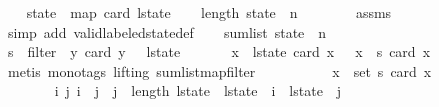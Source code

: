 \begin{isabellebody}
\isanewline
\ \ \isamarkupfalse%
\ {\isacharquery}state\ {\isacharequal}\ {\isachardoublequoteopen}map\ card\ l{\isacharunderscore}state{\isachardoublequoteclose}\isanewline
\ \ \isamarkupfalse%
\ {\isachardoublequoteopen}length\ {\isacharquery}state\ {\isacharequal}\ n\ {\isacharplus}\ {}{\isachardoublequoteclose}\isanewline
\ \ \ \ \isamarkupfalse%
\ assms\isanewline
\ \ \ \ \isamarkupfalse%
\ {\isacharparenleft}simp\ add{\isacharcolon}\ valid{\isacharunderscore}labeled{\isacharunderscore}state{\isacharunderscore}def{\isacharparenright}\isanewline
\isanewline
\ \ \isamarkupfalse%
\ {\isachardoublequoteopen}sum{\isacharunderscore}list\ {\isacharquery}state\ {\isacharequal}\ n{\isachardoublequoteclose}\isanewline
\ \ \isamarkupfalse%
{\isacharminus}\isanewline
\ \ \ \ \isamarkupfalse%
\ {\isacharquery}s\ {\isacharequal}\ {\isachardoublequoteopen}filter\ {\isacharparenleft}{\isasymlambda}\ y{\isachardot}\ card\ y\ {\isasymnoteq}\ {}{\isacharparenright}\ l{\isacharunderscore}state{\isachardoublequoteclose}\isanewline
\isanewline
\ \ \ \ \isamarkupfalse%
\ {\isachardoublequoteopen}{\isacharparenleft}{\isasymSum}\ x\ {\isasymleftarrow}\ l{\isacharunderscore}state{\isachardot}\ card\ x{\isacharparenright}\ {\isacharequal}\ {\isacharparenleft}{\isasymSum}\ x\ {\isasymleftarrow}\ {\isacharquery}s{\isachardot}\ card\ x{\isacharparenright}{\isachardoublequoteclose}\isanewline
\ \ \ \ \ \ \isamarkupfalse%
\ {\isacharparenleft}metis\ {\isacharparenleft}mono{\isacharunderscore}tags{\isacharcomma}\ lifting{\isacharparenright}\ sum{\isacharunderscore}list{\isacharunderscore}map{\isacharunderscore}filter{\isacharparenright}\isanewline
\ \ \ \ \isamarkupfalse%
\ \isamarkupfalse%
\ {\isachardoublequoteopen}{\isachardot}{\isachardot}{\isachardot}\ {\isacharequal}\ {\isacharparenleft}{\isasymSum}\ x\ {\isasymin}\ set\ {\isacharquery}s{\isachardot}\ card\ x{\isacharparenright}{\isachardoublequoteclose}\isanewline
\ \ \ \ \isamarkupfalse%
{\isacharminus}\isanewline
\ \ \ \ \ \ \isamarkupfalse%
\ {\isachardoublequoteopen}{\isasymforall}i\ j{\isachardot}\ i\ {\isacharless}\ j\ {\isasymand}\ j\ {\isacharless}\ length\ l{\isacharunderscore}state\ {\isasymlongrightarrow}\ l{\isacharunderscore}state\ {\isacharbang}\ i\ {\isasyminter}\ l{\isacharunderscore}state\ {\isacharbang}\ j\ {\isacharequal}\ {\isacharbraceleft}{\isacharbraceright}{\isachardoublequoteclose}\isanewline

\end{isabellebody}
